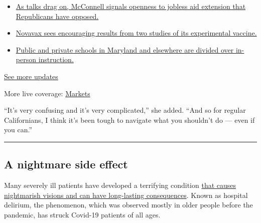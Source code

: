 \begin{itemize}
\tightlist
\item
  \href{https://www.nytimes3xbfgragh.onion/2020/08/04/world/coronavirus-cases.html?action=click\&pgtype=Article\&state=default\&region=MAIN_CONTENT_1\&context=storylines_live_updates\#link-2daa96b5}{As
  talks drag on, McConnell signals openness to jobless aid extension
  that Republicans have opposed.}
\item
  \href{https://www.nytimes3xbfgragh.onion/2020/08/04/world/coronavirus-cases.html?action=click\&pgtype=Article\&state=default\&region=MAIN_CONTENT_1\&context=storylines_live_updates\#link-1228a480}{Novavax
  sees encouraging results from two studies of its experimental
  vaccine.}
\item
  \href{https://www.nytimes3xbfgragh.onion/2020/08/04/world/coronavirus-cases.html?action=click\&pgtype=Article\&state=default\&region=MAIN_CONTENT_1\&context=storylines_live_updates\#link-4825b93}{Public
  and private schools in Maryland and elsewhere are divided over
  in-person instruction.}
\end{itemize}

\href{https://www.nytimes3xbfgragh.onion/2020/08/04/world/coronavirus-cases.html?action=click\&pgtype=Article\&state=default\&region=MAIN_CONTENT_1\&context=storylines_live_updates}{See
more updates}

More live coverage:
\href{https://www.nytimes3xbfgragh.onion/live/2020/08/04/business/stock-market-today-coronavirus?action=click\&pgtype=Article\&state=default\&region=MAIN_CONTENT_1\&context=storylines_live_updates}{Markets}

``It's very confusing and it's very complicated,'' she added. ``And so
for regular Californians, I think it's been tough to navigate what you
shouldn't do --- even if you can.''

\begin{center}\rule{0.5\linewidth}{\linethickness}\end{center}

\hypertarget{a-nightmare-side-effect}{%
\subsection{A nightmare side effect}\label{a-nightmare-side-effect}}

Many severely ill patients have developed a terrifying condition
\href{https://www.nytimes3xbfgragh.onion/2020/06/28/health/coronavirus-delirium-hallucinations.html}{that
causes nightmarish visions and can have long-lasting consequences}.
Known as hospital delirium, the phenomenon, which was observed mostly in
older people before the pandemic, has struck Covid-19 patients of all
ages.

